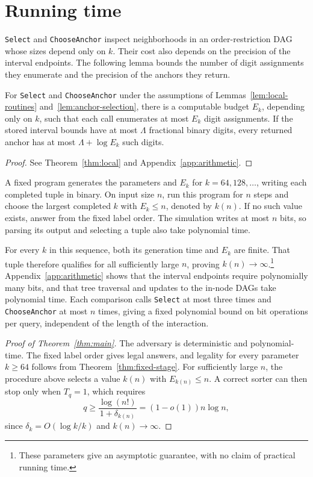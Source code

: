 \section{Running time}\label{sec:runtime}\label{sec:parameter-selection}

\texttt{Select} and \texttt{ChooseAnchor} inspect neighborhoods in an
order-restriction DAG whose sizes depend only on $k$. Their cost also
depends on the precision of the interval endpoints. The following lemma
bounds the number of digit assignments they enumerate and the precision
of the anchors they return.

\begin{lemma}\label{lem:local-cost}
For \textnormal{\texttt{Select}} and \textnormal{\texttt{ChooseAnchor}}
under the assumptions of Lemmas~\ref{lem:local-routines}
and~\ref{lem:anchor-selection}, there is a computable
budget $E_k$, depending only on $k$, such that each call enumerates at
most $E_k$ digit assignments. If the stored interval bounds have at most
$\Lambda$ fractional binary digits, every returned anchor has at most
$\Lambda+\log E_k$ such digits.
\end{lemma}
\begin{proof}
See Theorem~\ref{thm:local} and Appendix~\ref{app:arithmetic}.
\end{proof}

A fixed program generates the parameters and $E_k$ for
$k=64,128,\ldots$, writing each completed tuple in binary. On input
size $n$, run this program for $n$ steps and choose the largest completed
$k$ with $E_k\le n$, denoted by $k(n)$. If no such value exists, answer from the fixed label
order. The simulation writes at most $n$ bits, so parsing its output
and selecting a tuple also take polynomial time.

For every $k$ in this sequence, both its generation time and $E_k$ are finite.
That tuple therefore qualifies for all sufficiently large $n$, proving
$k(n)\to\infty$.\footnote{These parameters give an asymptotic guarantee,
with no claim of practical running time.} Appendix~\ref{app:arithmetic}
shows that the interval endpoints require polynomially many bits, and
that tree traversal and updates to the in-node DAGs take polynomial time.
Each comparison calls \texttt{Select} at most three times and
\texttt{ChooseAnchor} at most $n$ times, giving a fixed polynomial bound
on bit operations per query, independent of the length of the interaction.

\begin{proof}[Proof of Theorem~\ref{thm:main}]
The adversary is deterministic and polynomial-time. The fixed label
order gives legal answers, and legality for every parameter $k\ge64$
follows from Theorem~\ref{thm:fixed-stage}. For sufficiently large $n$,
the procedure above selects a value $k(n)$ with $E_{k(n)}\le n$.
A correct sorter can then stop only when $T_q=1$, which requires
\[
q\ge\frac{\log(n!)}{1+\delta_{k(n)}}=(1-o(1))n\log n,
\]
since $\delta_k=O(\log k/k)$ and $k(n)\to\infty$.
\end{proof}
